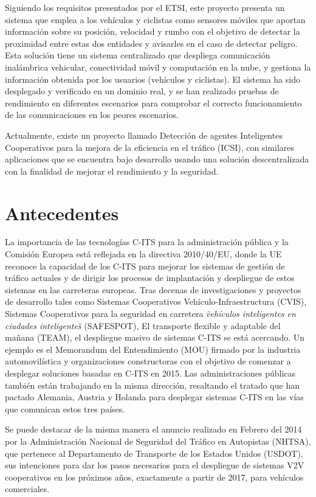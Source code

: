 Siguiendo los requisitos presentados por el ETSI, este proyecto presenta un sistema
que emplea a los vehículos y ciclistas como sensores móviles que aportan información
sobre su posición, velocidad y rumbo con el objetivo de detectar la proximidad entre
estas dos entidades y avisarles en el caso de detectar peligro. Esta solución tiene un
sistema centralizado que despliega comunicación inalámbrica vehicular, conectividad
móvil y computación en la nube, y gestiona la información obtenida por los usuarios
(vehículos y ciclistas). El sistema ha sido desplegado y verificado en un dominio real,
y se han realizado pruebas de rendimiento en diferentes escenarios para comprobar el
correcto funcionamiento de las comunicaciones en los peores escenarios.

Actualmente, existe un proyecto llamado Detección de agentes Inteligentes Cooperativos
para la mejora de la eficiencia en el tráfico (ICSI), con similares aplicaciones que
se encuentra bajo desarrollo usando una solución descentralizada con la finalidad de
mejorar el rendimiento y la seguridad.

\section{Antecedentes}\label{section:antecedentes}
La importancia de las tecnologías C-ITS para la administración pública y la Comisión
Europea está reflejada en la directiva 2010/40/EU, donde la UE reconoce la capacidad
de los C-ITS para mejorar los sistemas de gestión de tráfico actuales y de dirigir
los procesos de implantación y despliegue de estos sistemas en las carreteras
europeas. Tras decenas de investigaciones y proyectos de desarrollo tales como
Sistemas Cooperativos Vehículo-Infraestructura (CVIS), Sistemas Cooperativos para la
seguridad en carretera \emph{\"vehículos inteligentes en ciudades inteligentes\"}
(SAFESPOT), El transporte flexible y adaptable del mañana (TEAM), el despliegue
masivo de sistemas C-ITS se está acercando. Un ejemplo es el Memorandum del
Entendimiento (MOU) firmado por la industria automovilística y organizaciones
constructoras con el objetivo de comenzar a desplegar soluciones basadas en C-ITS en
2015. Las administraciones públicas también están trabajando en la misma dirección,
resaltando el tratado que han pactado Alemania, Austria y Holanda para desplegar sistemas
C-ITS en las vías que comunican estos tres países.

Se puede destacar de la misma manera el anuncio realizado en Febrero del 2014 por la
Administración Nacional de Seguridad del Tráfico en Autopistas (NHTSA), que pertenece
al Departamento de Transporte de los Estados Unidos (USDOT), sus intenciones para dar
los pasos necesarios para el despliegue de sistemas V2V cooperativos en los próximos
años, exactamente a partir de 2017, para vehículos comerciales.
